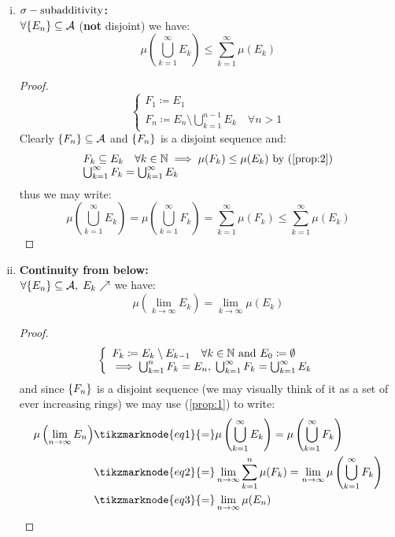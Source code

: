 \begin{enumerate}[i)]
    \item \label{prop:3} \textbf{$\sigma-\text{subadditivity}$:} \\
    $\forall \{ E_n \}\subseteq\mathcal{A}$ (\textbf{not} disjoint) we have:
    \[
        \mu\left( \bigcup_{k=1}^{\infty} E_k \right) \leq \sum_{k=1}^{\infty} \mu(E_k)
    \]
    \begin{proof}
    \provdef{}
    \[
        \left\{ \begin{array}{l}
            F_1 \coloneqq E_1 \\
            F_n \coloneqq E_n \setminus \bigcup_{k=1}^{n-1} E_k \quad \forall n > 1
        \end{array} \right.  
    \]
    Clearly $\{ F_n \} \subseteq \mathcal{A}$ and $\{ F_n \}$ is a disjoint sequence and:
    \[
        \begin{array}{l}
            F_k \subseteq E_k \quad \forall k\in\mathbb{N} \implies \mu(F_k) \leq \mu(E_k) \text{ by (\ref{prop:2})} \\
            \bigcup_{k=1}^{\infty} F_k = \bigcup_{k=1}^{\infty} E_k    
        \end{array}
    \]
    thus we may write:
    \[
        \mu\left( \bigcup_{k=1}^{\infty} E_k \right) = \mu\left( \bigcup_{k=1}^{\infty} F_k \right) = \sum_{k=1}^{\infty} \mu(F_k) \leq \sum_{k=1}^{\infty} \mu(E_k)   
    \]
    \end{proof}

    \item \label{prop:4} \textbf{Continuity from below:} \\
    $\forall \{ E_n \}\subseteq\mathcal{A}, \; E_k \nearrow$ we have:
    \[
        \mu \left( \lim_{k\to\infty}E_k \right)  = \lim_{k\to\infty} \mu(E_k)    
    \]
    \begin{proof}
    \[
        \left\{ \begin{array}{l}
            F_k \coloneqq E_k \setminus E_{k-1} \quad \forall k \in\mathbb{N} \text{ and } E_0 \coloneqq \emptyset \\
            \implies \bigcup_{k=1}^n F_k = E_n ,\; \bigcup_{k=1}^{\infty} F_k = \bigcup_{k=1}^{\infty} E_k
        \end{array} \right.
    \]
    and since $\{ F_n \}$ is a disjoint sequence (we may visually think of it as a set of ever increasing rings) we may use (\ref{prop:1}) to write:
    \begin{align*}
        \mu\left( \lim_{n\to\infty} E_n \right) &\tikzmarknode{eq1}{=} \mu\left( \bigcup_{k=1}^{\infty} E_k \right) = \mu\left( \bigcup_{k=1}^{\infty} F_k \right) \\
        & \tikzmarknode{eq2}{=} \lim_{n\to\infty}\sum_{k=1}^{n} \mu(F_k) = \lim_{n\to\infty} \mu \left( \bigcup_{k=1}^{\infty} F_k \right) \\
        & \tikzmarknode{eq3}{=} \lim_{n\to\infty} \mu(E_n)
    \end{align*} 
    \end{proof}


\end{enumerate}
